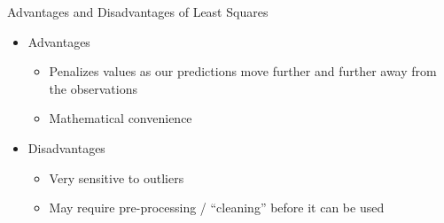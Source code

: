 \documentclass[aspectratio=169]{beamer}
\begin{document}
\begin{frame}{Advantages and Disadvantages of Least Squares}
\begin{itemize}
\item Advantages
\begin{itemize}
\item Penalizes values as our predictions move further and further away from the observations
\item Mathematical convenience
\end{itemize}
\item Disadvantages
\begin{itemize}
\item Very sensitive to outliers
\item May require pre-processing / ``cleaning'' before it can be used
\end{itemize}
\end{itemize}
\end{frame}
\end{document}
